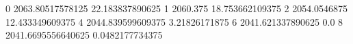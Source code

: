 0 2063.80517578125 22.183837890625
1 2060.375 18.753662109375
2 2054.0546875 12.433349609375
4 2044.839599609375 3.21826171875
6 2041.621337890625 0.0
8 2041.6695556640625 0.0482177734375
